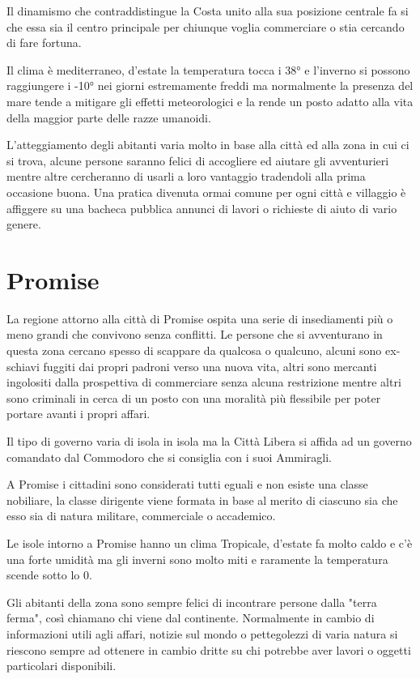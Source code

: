 \documentclass[letterpaper,twocolumn,openany,nodeprecatedcode]{dndbook}
\begin{document}
Il dinamismo che contraddistingue la Costa unito alla sua posizione centrale fa si che essa sia il centro principale per chiunque voglia commerciare o stia cercando di fare fortuna.

Il clima è mediterraneo, d'estate la temperatura tocca i 38° e l'inverno si possono raggiungere i -10° nei giorni estremamente freddi ma normalmente la presenza del mare tende a mitigare gli effetti meteorologici e la rende un posto adatto alla vita della maggior parte delle razze umanoidi.

L'atteggiamento degli abitanti varia molto in base alla città ed alla zona in cui ci si trova, alcune persone saranno felici di accogliere ed aiutare gli avventurieri mentre altre cercheranno di usarli a loro vantaggio tradendoli alla prima occasione buona. Una pratica divenuta ormai comune per ogni città e villaggio è affiggere su una bacheca pubblica annunci di lavori o richieste di aiuto di vario genere.

\section{Promise}
La regione attorno alla città di Promise ospita una serie di insediamenti più o meno grandi che convivono senza conflitti. Le persone che si avventurano in questa zona cercano spesso di scappare da qualcosa o qualcuno, alcuni sono ex-schiavi fuggiti dai propri padroni verso una nuova vita, altri sono mercanti ingolositi dalla prospettiva di commerciare senza alcuna restrizione mentre altri sono criminali in cerca di un posto con una moralità più flessibile per poter portare avanti i propri affari.

Il tipo di governo varia di isola in isola ma la Città Libera si affida ad un governo comandato dal Commodoro che si consiglia con i suoi Ammiragli.

A Promise i cittadini sono considerati tutti eguali e non esiste una classe nobiliare, la classe dirigente viene formata in base al merito di ciascuno sia che esso sia di natura militare, commerciale o accademico.

Le isole intorno a Promise hanno un clima Tropicale, d'estate fa molto caldo e c'è una forte umidità ma gli inverni sono molto miti e raramente la temperatura scende sotto lo 0.

Gli abitanti della zona sono sempre felici di incontrare persone dalla "terra ferma", così chiamano chi viene dal continente. Normalmente in cambio di informazioni utili agli affari, notizie sul mondo o pettegolezzi di varia natura si riescono sempre ad ottenere in cambio dritte su chi potrebbe aver lavori o oggetti particolari disponibili.
\end{document}
